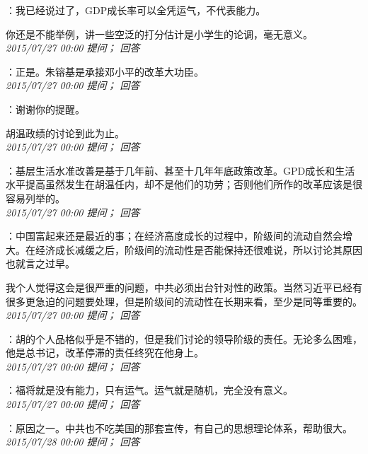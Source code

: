 \documentclass[twocolumn]{ctexart}
\begin{document}
：我已经说过了，GDP成长率可以全凭运气，不代表能力。

你还是不能举例，讲一些空泛的打分估计是小学生的论调，毫无意义。\\

\textit{\hfill\noindent\small 2015/07/27 00:00 提问； 回答}

：正是。朱镕基是承接邓小平的改革大功臣。\\

\textit{\hfill\noindent\small 2015/07/27 00:00 提问； 回答}

：谢谢你的提醒。

胡温政绩的讨论到此为止。\\

\textit{\hfill\noindent\small 2015/07/27 00:00 提问； 回答}

：基层生活水准改善是基于几年前、甚至十几年年底政策改革。GPD成长和生活水平提高虽然发生在胡温任内，却不是他们的功劳；否则他们所作的改革应该是很容易列举的。\\

\textit{\hfill\noindent\small 2015/07/27 00:00 提问； 回答}

：中国富起来还是最近的事；在经济高度成长的过程中，阶级间的流动自然会增大。在经济成长减缓之后，阶级间的流动性是否能保持还很难说，所以讨论其原因也就言之过早。

我个人觉得这会是很严重的问题，中共必须出台针对性的政策。当然习近平已经有很多更急迫的问题要处理，但是阶级间的流动性在长期来看，至少是同等重要的。\\

\textit{\hfill\noindent\small 2015/07/27 00:00 提问； 回答}

：胡的个人品格似乎是不错的，但是我们讨论的领导阶级的责任。无论多么困难，他是总书记，改革停滞的责任终究在他身上。\\

\textit{\hfill\noindent\small 2015/07/27 00:00 提问； 回答}

：福将就是没有能力，只有运气。运气就是随机，完全没有意义。\\

\textit{\hfill\noindent\small 2015/07/27 00:00 提问； 回答}

：原因之一。中共也不吃美国的那套宣传，有自己的思想理论体系，帮助很大。\\

\textit{\hfill\noindent\small 2015/07/28 00:00 提问； 回答}
\end{document}
